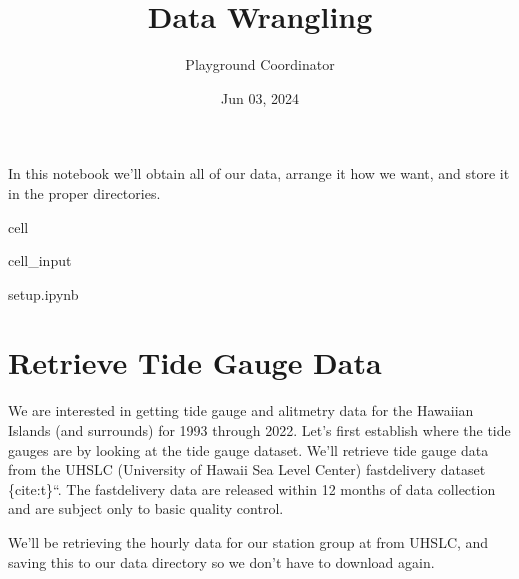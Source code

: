 \documentclass[letterpaper,10pt,english]{jupyterBook}
\title{Data Wrangling}
\date{Jun 03, 2024}
\author{Playground Coordinator}
\begin{document}
\pagestyle{empty}
\sphinxmaketitle
\pagestyle{plain}
\sphinxtableofcontents
\pagestyle{normal}
\label{\detokenize{notebooks/SL_Data_Wrangling::doc}}


\sphinxAtStartPar
In this notebook we’ll obtain all of our data, arrange it how we want, and store it in the proper directories.

\begin{sphinxuseclass}{cell}\begin{sphinxVerbatimInput}

\begin{sphinxuseclass}{cell_input}
\begin{sphinxVerbatim}[commandchars=\\\{\}]
 setup.ipynb
  
  
\end{sphinxVerbatim}

\end{sphinxuseclass}\end{sphinxVerbatimInput}

\end{sphinxuseclass}

\part{Retrieve Tide Gauge Data}
\label{\detokenize{notebooks/SL_Data_Wrangling:retrieve-tide-gauge-data}}
\sphinxAtStartPar
We are interested in getting tide gauge and alitmetry data for the Hawaiian Islands (and surrounds) for 1993 through 2022.
Let’s first establish where the tide gauges are by looking at the tide gauge dataset. We’ll retrieve tide gauge data from the UHSLC (University of Hawaii Sea Level Center) fast\sphinxhyphen{}delivery dataset \{cite:t\}``. The fast\sphinxhyphen{}delivery data are released within 1\sphinxhyphen{}2 months of data collection and are subject only to basic quality control.

\sphinxAtStartPar
We’ll be retrieving the hourly data for our station group at from UHSLC, and saving this to our data directory so we don’t have to download again.
\end{document}

